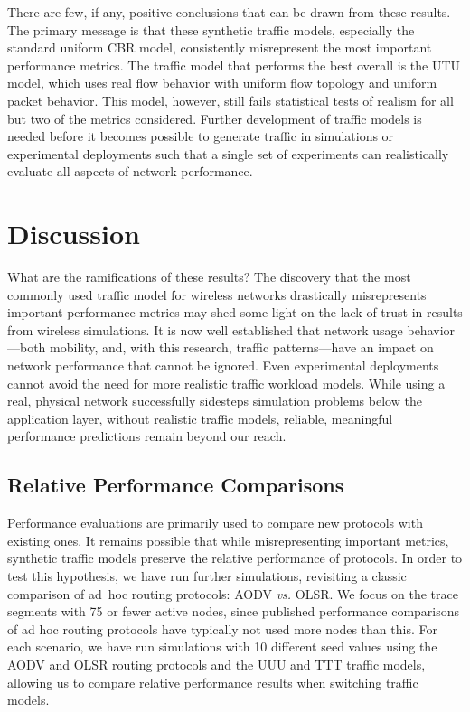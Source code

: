 \documentclass[conference]{IEEEtran}
\newcommand{\caps}[1]{{\small{#1}}}
\begin{document}
There are few, if any, positive conclusions that can be drawn from these results. The primary message is that these synthetic traffic models, especially the standard uniform \caps{CBR} model, consistently misrepresent the most important performance metrics. The traffic model that performs the best overall is the \caps{UTU} model, which uses real flow behavior with uniform flow topology and uniform packet behavior. This model, however, still fails statistical tests of realism for all but two of the metrics considered. Further development of traffic models is needed before it becomes possible to generate traffic in simulations or experimental deployments such that a single set of experiments can realistically evaluate all aspects of network performance.

\section{Discussion}\label{sec:discussion}

What are the ramifications of these results? The discovery that the most commonly used traffic model for wireless networks drastically misrepresents important performance metrics may shed some light on the lack of trust in results from wireless simulations. It is now well established that network usage behavior---both mobility, and, with this research, traffic patterns---have an impact on network performance that cannot be ignored. Even experimental deployments cannot avoid the need for more realistic traffic workload models. While using a real, physical network successfully sidesteps simulation problems below the application layer, without realistic traffic models, reliable, meaningful performance predictions remain beyond our reach.

\subsection{Relative Performance Comparisons}

Performance evaluations are primarily used to compare new protocols with existing ones. It remains possible that while misrepresenting important metrics, synthetic traffic models preserve the relative performance of protocols. In order to test this hypothesis, we have run further simulations, revisiting a classic comparison of ad~hoc routing protocols: \caps{AODV} \textit{vs.} \caps{OLSR}. %
We focus on the trace segments with 75 or fewer active nodes, since published performance comparisons of ad hoc routing protocols have typically not used more nodes than this. For each scenario, we have run simulations with 10 different seed values using the \caps{AODV} and \caps{OLSR} routing protocols and the \caps{UUU} and \caps{TTT} traffic models, allowing us to compare relative performance results when switching traffic models.
\end{document}
